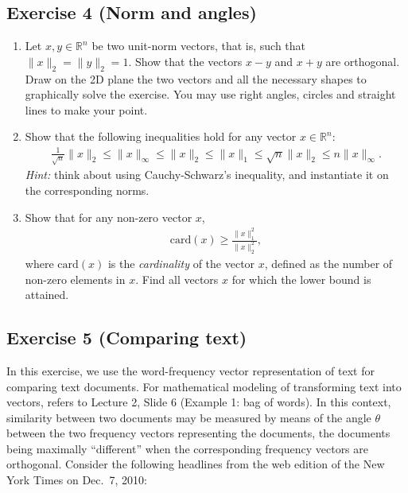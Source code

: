 \documentclass[11pt]{article}
\begin{document}
\newpage
\subsection*{Exercise 4 (Norm and angles)}

\begin{enumerate}
    \item Let $x,y\in\mathbb{R}^{n}$ be two unit-norm vectors, that is, such that $\|x\|_2 = \|y\|_2=1$. Show that the vectors $x-y$ and $x+y$ are orthogonal. Draw on the 2D plane the two vectors and all the necessary shapes to graphically solve the exercise. You may use right angles, circles and straight lines to make your point.
    
    \item
    Show that the following inequalities hold for any vector $x \in \mathbb{R}^{n}$:
    \begin{align*}
        \frac{1}{\sqrt{n}}\|x\|_2 \leq \|x\|_\infty \leq  \|x\|_2 \leq \|x\|_1 \leq \sqrt{n} \|x\|_2 \le n\|x\|_\infty.
    \end{align*}
    \textit{Hint:} think about using Cauchy-Schwarz's inequality, and instantiate it on the corresponding norms. 
    
    \item Show that for any non-zero vector $x$,
    \begin{align*}
        \text{card}(x) \ge \frac{\|x\|_1^2}{\|x\|_2^2},
    \end{align*}
    where $\text{card}(x)$ is the \emph{cardinality} of the vector $x$, defined as the number of non-zero elements in $x$. Find all vectors $x$ for which the lower bound is attained.
\end{enumerate}

\begin{solution}
\end{solution}

\newpage
\subsection*{Exercise 5 (Comparing text)}

In this exercise, we  use the word-fre\-quen\-cy vector representation of text 
 for comparing  text documents. For mathematical modeling of transforming text into vectors, refers to Lecture 2, Slide 6 (Example 1: bag of words). 
In this context, similarity between two documents may be measured by means of the angle $\theta$ between the two frequency vectors
representing the documents, the documents being maximally ``different'' when the corresponding frequency vectors are orthogonal.
Consider the following
headlines from the web edition of the New York Times on Dec.\ 7, 2010:
\end{document}
